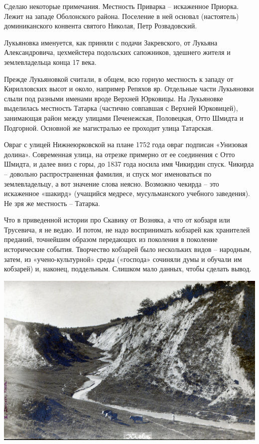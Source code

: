 Сделаю некоторые примечания. Местность Приварка – искаженное Приорка. Лежит на западе Оболонского района. Поселение в ней основал (настоятель) доминиканского конвента святого Николая, Петр Розвадовский. 

Лукьяновка именуется, как приняли с подачи Закревского, от Лукьяна Александровича, цехмейстера подольских сапожников, здешнего жителя и землевладельца конца 17 века.

Прежде Лукьяновкой считали, в общем, всю горную местность к западу от Кирилловских высот и около, например Репяхов яр. Отдельные части Лукьяновки слыли под разными именами вроде Верхней Юрковицы. На Лукьяновке выделилась местность Татарка (частично совпавшая с Верхней Юрковицей), занимающая район между улицами Печенежская, Половецкая, Отто Шмидта и Подгорной. Основной же магистралью ее проходит улица Татарская.

Овраг с улицей Нижнеюрковской на плане 1752 года овраг подписан «Унизовая долина». Современная улица, на отрезке примерно от ее соединения с Отто Шмидта, и далее вниз с горы, до 1837 года носила имя Чикирдин спуск. Чикирда – довольно распространенная фамилия, и спуск мог именоваться по землевладельцу, а вот значение слова неясно. Возможно чекирда – это искаженное «шакирд» (учащийся медресе, мусульманского учебного заведения). Не зря же местность – Татарка.

Что в приведенной истории про Скавику от Возняка, а что от кобзаря или Трусевича, я не ведаю. И потом, не надо воспринимать кобзарей как хранителей преданий, точнейшим образом передающих из поколения в поколение исторические события. Творчество кобзарей было нескольких видов – народным, затем, из «учено-культурной» среды («господа» сочиняли думы и обучали им кобзарей) и, наконец, поддельным. Слишком мало данных, чтобы сделать вывод.

\newpage
\vspace*{\fill}
\begin{center}
\includegraphics[width=\linewidth]{chast-colebanie-osnov/sheka/lukold01.jpg}
\end{center}

